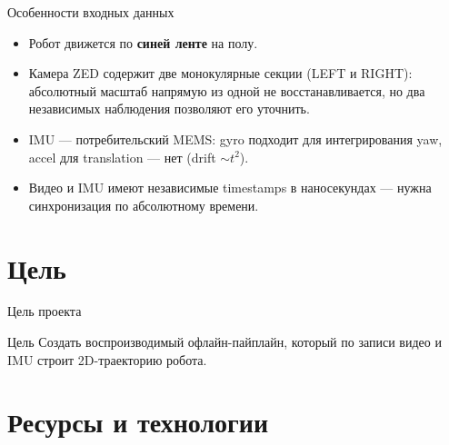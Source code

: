 \documentclass[aspectratio=169]{beamer}
\begin{document}
\begin{frame}{Особенности входных данных}
    \begin{itemize}
        \item Робот движется по \textbf{синей ленте} на полу.
        \item Камера ZED содержит две монокулярные секции (LEFT и RIGHT): абсолютный масштаб напрямую из одной не восстанавливается, но два независимых наблюдения позволяют его уточнить.
        \item IMU --- потребительский MEMS: gyro подходит для интегрирования yaw, accel для translation --- нет (drift $\sim t^2$).
        \item Видео и IMU имеют независимые timestamps в наносекундах --- нужна синхронизация по абсолютному времени.
    \end{itemize}
\end{frame}

\section{Цель}

\begin{frame}{Цель проекта}
    \begin{block}{Цель}
        Создать воспроизводимый офлайн-пайплайн, который по записи видео и IMU строит 2D-траекторию робота.
    \end{block}
\end{frame}

\section{Ресурсы и технологии}
\end{document}
